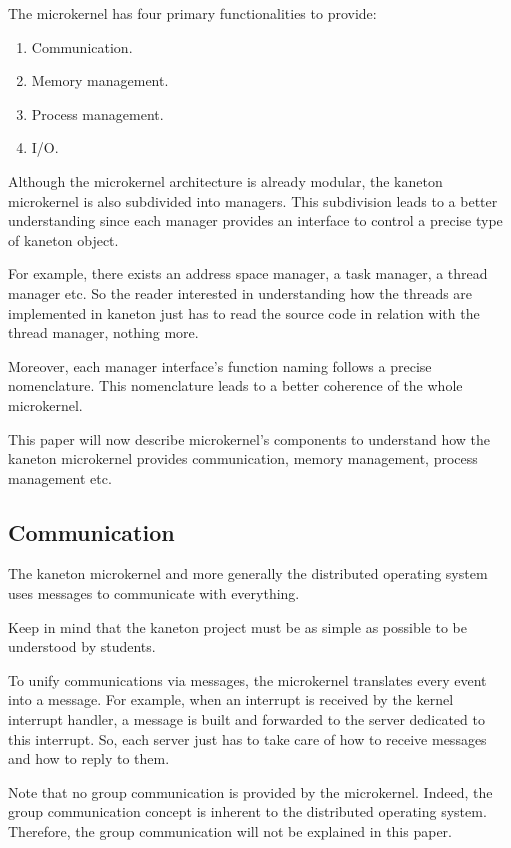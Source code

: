 \begin{multicols}{2}
The microkernel has four primary functionalities to provide:

\begin{enumerate}
  \item
    Communication.
  \item
    Memory management.
  \item
    Process management.
  \item
    I/O.
\end{enumerate}

Although the microkernel architecture is already modular, the kaneton
microkernel is also subdivided into managers. This subdivision leads to
a better understanding since each manager provides an interface to control
a precise type of kaneton object.

For example, there exists an address space manager, a task manager,
a thread manager etc. So the reader interested in understanding how
the threads are implemented in kaneton just has to read the source code
in relation with the thread manager, nothing more.

Moreover, each manager interface's function naming follows a precise
nomenclature. This nomenclature leads to a better coherence of the whole
microkernel.

This paper will now describe microkernel's components to understand how
the kaneton microkernel provides communication, memory management, process
management etc.

%
%

\subsection{Communication}

The kaneton microkernel and more generally the distributed operating
system uses messages to communicate with everything.

Keep in mind that the kaneton project must be as simple as possible to be
understood by students.

To unify communications via messages, the microkernel translates every event
into a message. For example, when an interrupt is received by the kernel
interrupt handler, a message is built and forwarded to the server dedicated
to this interrupt. So, each server just has to take care of how to receive
messages and how to reply to them.

Note that no group communication is provided by the microkernel. Indeed, the
group communication concept is inherent to the distributed operating system.
Therefore, the group communication will not be explained in this paper.


\end{multicols}
